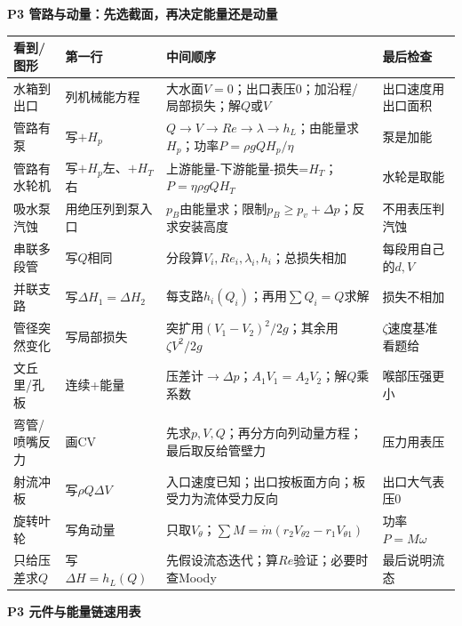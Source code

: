 \documentclass[UTF8,a4paper]{ctexart}
\newcommand{\ftitle}[1]{\vspace{1pt}\textbf{\textcolor{B}{#1}}\par\vspace{0.5pt}}
\begin{document}
\ftitle{P3 管路与动量：先选截面，再决定能量还是动量}
\begin{tabular}{|L{0.19\textwidth}|L{0.23\textwidth}|L{0.34\textwidth}|L{0.19\textwidth}|}\hline
\textbf{看到/图形} & \textbf{第一行} & \textbf{中间顺序} & \textbf{最后检查}\\\hline
水箱到出口 & 列机械能方程 & 大水面$V=0$；出口表压0；加沿程/局部损失；解$Q$或$V$ & 出口速度用出口面积 \\\hline
管路有泵 & 写$+H_p$ & $Q\to V\to Re\to\lambda\to h_L$；由能量求$H_p$；功率$P=\rho gQH_p/\eta$ & 泵是加能 \\\hline
管路有水轮机 & 写$+H_p$左、$+H_T$右 & 上游能量-下游能量-损失=$H_T$；$P=\eta\rho gQH_T$ & 水轮是取能 \\\hline
吸水泵汽蚀 & 用绝压列到泵入口 & $p_B$由能量求；限制$p_B\ge p_v+\Delta p$；反求安装高度 & 不用表压判汽蚀 \\\hline
串联多段管 & 写$Q$相同 & 分段算$V_i,Re_i,\lambda_i,h_i$；总损失相加 & 每段用自己的$d,V$ \\\hline
并联支路 & 写$\Delta H_1=\Delta H_2$ & 每支路$h_i(Q_i)$；再用$\sum Q_i=Q$求解 & 损失不相加 \\\hline
管径突然变化 & 写局部损失 & 突扩用$(V_1-V_2)^2/2g$；其余用$\zeta V^2/2g$ & $\zeta$速度基准看题给 \\\hline
文丘里/孔板 & 连续+能量 & 压差计$\to\Delta p$；$A_1V_1=A_2V_2$；解$Q$乘系数 & 喉部压强更小 \\\hline
弯管/喷嘴反力 & 画CV & 先求$p,V,Q$；再分方向列动量方程；最后取反给管壁力 & 压力用表压 \\\hline
射流冲板 & 写$\rho Q\Delta V$ & 入口速度已知；出口按板面方向；板受力为流体受力反向 & 出口大气表压0 \\\hline
旋转叶轮 & 写角动量 & 只取$V_\theta$；$\sum M=\dot m(r_2V_{\theta2}-r_1V_{\theta1})$ & 功率$P=M\omega$ \\\hline
只给压差求$Q$ & 写$\Delta H=h_L(Q)$ & 先假设流态迭代；算$Re$验证；必要时查Moody & 最后说明流态 \\\hline
\end{tabular}
\ftitle{P3 元件与能量链速用表}
\end{document}

